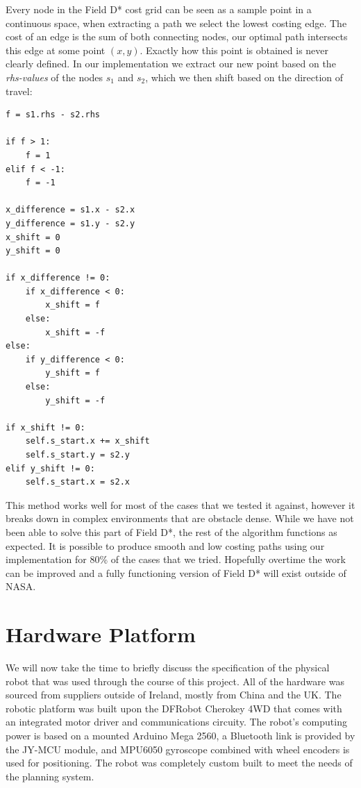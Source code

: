 \noindent
Every node in the Field D* cost grid can be seen as a sample point in a continuous space, when extracting a path we select the lowest costing edge. The cost of an edge is the sum of both connecting nodes, our optimal path intersects this edge at some point $(x, y)$. Exactly how this point is obtained is never clearly defined. In our implementation we extract our new point based on the \textit{rhs-values} of the nodes $s_{1}$ and $s_{2}$, which we then shift based on the direction of travel: \\

\begin{lstlisting}
f = s1.rhs - s2.rhs

if f > 1:
	f = 1
elif f < -1:
	f = -1

x_difference = s1.x - s2.x
y_difference = s1.y - s2.y
x_shift = 0
y_shift = 0

if x_difference != 0:
	if x_difference < 0:
		x_shift = f
	else:
		x_shift = -f
else:
	if y_difference < 0:
		y_shift = f
	else:
		y_shift = -f

if x_shift != 0:
	self.s_start.x += x_shift
	self.s_start.y = s2.y
elif y_shift != 0:
	self.s_start.x = s2.x
\end{lstlisting}

\noindent
This method works well for most of the cases that we tested it against, however it breaks down in complex environments that are obstacle dense. While we have not been able to solve this part of Field D*, the rest of the algorithm functions as expected. It is possible to produce smooth and low costing paths using our implementation for 80\% of the cases that we tried. Hopefully overtime the work can be improved and a fully functioning version of Field D* will exist outside of NASA.

\newpage

\section{Hardware Platform}
\noindent
We will now take the time to briefly discuss the specification of the physical robot that was used through the course of this project. All of the hardware was sourced from suppliers outside of Ireland, mostly from China and the UK. The robotic platform was built upon the DFRobot Cherokey 4WD that comes with an integrated motor driver and communications circuity. The robot's computing power is based on a mounted Arduino Mega 2560, a Bluetooth link is provided by the JY-MCU module, and MPU6050 gyroscope combined with wheel encoders is used for positioning. The robot was completely custom built to meet the needs of the planning system. \\

